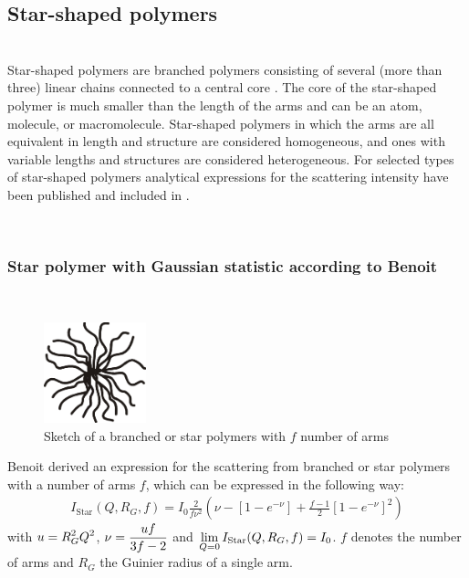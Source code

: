 \clearpage
\subsection{Star-shaped polymers}
\label{sect:StarShapedPolymers}
~\\
Star-shaped polymers \cite{Wikipedia2018StarShapedPolymers} are branched polymers consisting of several (more than three) linear chains connected to a central core \cite{Ren2016}. The core of the star-shaped polymer is much smaller than the length of the arms and can be an atom, molecule, or macromolecule. Star-shaped polymers in which the arms are all equivalent in length and structure are considered homogeneous, and ones with variable lengths and structures are considered heterogeneous. For selected types of star-shaped polymers analytical expressions for the scattering intensity have been published and included in \SASfit.

~\\
\subsubsection{Star polymer with Gaussian statistic according to Benoit}
\label{sect:Benoit}
~\\

\begin{figure}[htb]
\begin{center}
\includegraphics[width=0.2635\textwidth,height=0.2595\textwidth]{Benoit.png}
\end{center}
\caption{Sketch of a branched or star
polymers with $f$ number of arms} \label{fig:BenoitStar}
\end{figure}

Benoit \cite{Benoit53} derived an expression for the scattering from branched or star
polymers with a number of arms $f$, which can be expressed in the following way:
\begin{align}
I_\text{Star}(Q,R_G,f)= I_0 \frac{2}{f\nu^2}
    \left( \nu-\left[1-e^{-\nu}\right]+\frac{f-1}{2}\left[1-e^{-\nu}\right]^2\right)
\end{align}
with $\DS u=R_G^2Q^2$, $\DS \nu=\frac{uf}{3f-2}$ and $\DS
\lim_{Q=0}I_\text{Star}(Q,R_G,f)=I_0$. $f$
denotes the number of arms and $R_G$ the Guinier radius of a
single arm.

